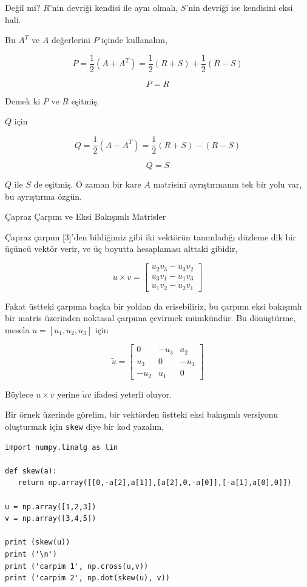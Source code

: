 \documentclass[12pt,fleqn]{article}\usepackage{../../common}
\begin{document}
Değil mi? $R$'nin devriği kendisi ile aynı olmalı, $S$'nin devriği ise
kendisini eksi hali.

Bu $A^T$ ve $A$ değerlerini $P$ içinde kullanalım,

$$
P = \frac{1}{2} (A + A^T) = \frac{1}{2} (R + S) + \frac{1}{2} (R - S)
$$

$$
P = R
$$

Demek ki $P$ ve $R$ eşitmiş.

$Q$ için

$$
Q = \frac{1}{2} (A-A^T) = \frac{1}{2} (R+S) - (R-S) 
$$

$$
Q = S
$$

$Q$ ile $S$ de eşitmiş. O zaman bir kare $A$ matrisini ayrıştırmanın tek bir
yolu var, bu ayrıştırma özgün.

Çapraz Çarpım ve Eksi Bakışımlı Matrisler

Çapraz çarpım [3]'den bildiğimiz gibi iki vektörün tanımladığı düzleme dik bir
üçüncü vektör verir, ve üç boyutta hesaplaması alttaki gibidir,

$$ 
u \times v = 
\left[\begin{array}{r}
u_2v_3 - u_3v_2 \\
u_3v_1 - u_1v_3 \\
u_1v_2 - u_2v_1 
\end{array}\right]
$$

Fakat üstteki çarpıma başka bir yoldan da erisebiliriz, bu çarpımı eksi
bakışımlı bir matris üzerinden noktasal çarpıma çevirmek mümkündür. Bu
dönüştürme, mesela $u = [u_1, u_2, u_3]$ için

$$
\tilde u =
\left[\begin{array}{ccc}
0 & -u_3 & a_2 \\
u_3 & 0 & -u_1 \\
-u_2 & u_1 & 0
\end{array}\right]
$$

Böylece $u \times v$ yerine $\tilde u v$ ifadesi yeterli oluyor.

Bir örnek üzerinde görelim, bir vektörden üstteki eksi bakışımlı versiyonu
oluşturmak için \verb!skew! diye bir kod yazalım,

\begin{verbatim}
import numpy.linalg as lin
  
def skew(a):
   return np.array([[0,-a[2],a[1]],[a[2],0,-a[0]],[-a[1],a[0],0]])

u = np.array([1,2,3])
v = np.array([3,4,5])

print (skew(u))
print ('\n')
print ('carpim 1', np.cross(u,v))
print ('carpim 2', np.dot(skew(u), v))
\end{verbatim}
\end{document}
